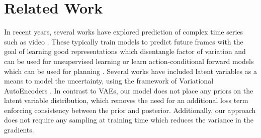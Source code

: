 \documentclass{article}
\begin{document}

\section{Related Work}

In recent years, several works have explored prediction of complex time series such as video \citep{mathieu-iclr-2016,canziani2017cortexnet, VPN}.
These typically train models to predict future frames with the goal of learning good representations which disentangle factor of variation and can be used for unsupervised learning \citep{Srivastava15, Villegas17, DentonB17} or learn action-conditional forward models which can be used for planning \citep{Oh15, FinnGL16, Poke, VPN}.
Several works have included latent variables as a means to model the uncertainty, using the framework of Variational AutoEncoders \citep{Babaeizadeh2018, Denton2018}.
In contrast to VAEs, our model does not place any priors on the latent variable distribution, which removes the need for an additional loss term enforcing consistency between the prior and posterior.
Additionally, our approach does not require any sampling at training time which reduces the variance in the gradients.
\end{document}
